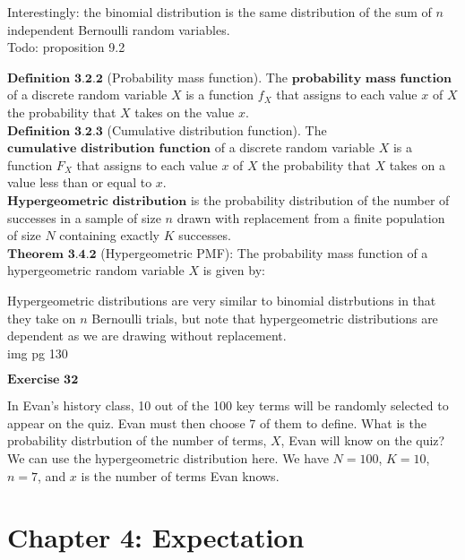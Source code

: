 \documentclass{article}
\begin{document}
    Interestingly: the binomial distribution is the same distribution of the sum of $n$ independent Bernoulli random variables. \\

    Todo: proposition 9.2

    $\textbf{Definition 3.2.2}$ (Probability mass function). The $\textbf{probability mass function}$ of a discrete random variable $X$ is a function $f_X$ that assigns to each value $x$ of $X$ the probability that $X$ takes on the value $x$.\\

    $\textbf{Definition 3.2.3}$ (Cumulative distribution function). The $\textbf{cumulative distribution function}$ of a discrete random variable $X$ is a function $F_X$ that assigns to each value $x$ of $X$ the probability that $X$ takes on a value less than or equal to $x$.\\

    $\textbf{Hypergeometric distribution}$ is the probability distribution of the number of successes in a sample of size $n$ drawn with replacement from a finite population of size $N$ containing exactly $K$ successes.\\

    $\textbf{Theorem 3.4.2}$ (Hypergeometric PMF): The probability mass function of a hypergeometric random variable $X$ is given by:

    Hypergeometric distributions are very similar to binomial distrbutions in that they take on $n$ Bernoulli trials, but note that hypergeometric distributions are dependent as we are drawing without replacement.\\


    img pg 130  

    $\textbf{Exercise 32}$
    
    In Evan's history class, 10 out of the 100 key terms will be randomly selected to appear on the quiz. Evan must then choose 7 of them to define. What is the probability distrbution of the number of terms, $X$, Evan will know on the quiz?\\

    We can use the hypergeometric distribution here. We have $N=100$, $K=10$, $n=7$, and $x$ is the number of terms Evan knows.\\

    \section{Chapter 4: Expectation}
\end{document}
